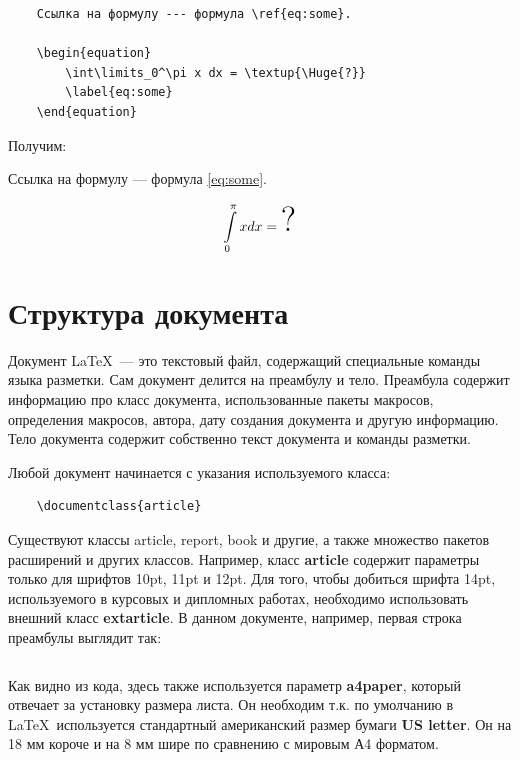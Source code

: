 \begin{verbatim}
    Ссылка на формулу --- формула \ref{eq:some}.

    \begin{equation}
        \int\limits_0^\pi x dx = \textup{\Huge{?}}
        \label{eq:some}
    \end{equation}
\end{verbatim}

Получим:

Ссылка на формулу --- формула \ref{eq:some}.

\begin{equation}
    \int\limits_0^\pi x dx = \textup{\Huge{?}}
    \label{eq:some}
\end{equation}

\section{Структура документа}

Документ \LaTeX~--- это текстовый файл, содержащий специальные команды языка разметки. Сам документ делится на преамбулу и тело. Преамбула содержит информацию про класс документа, использованные пакеты макросов, определения макросов, автора, дату создания документа и другую информацию. Тело документа содержит собственно текст документа и команды разметки.

Любой документ начинается с указания используемого класса:

\begin{verbatim}
    \documentclass{article}
\end{verbatim}

Существуют классы article, report, book и другие, а также множество пакетов расширений и других классов. Например, класс \textbf{article} содержит параметры только для шрифтов 10pt, 11pt и 12pt. Для того, чтобы добиться шрифта 14pt, используемого в курсовых и дипломных работах, необходимо использовать внешний класс \textbf{extarticle}. В данном документе, например, первая строка преамбулы выглядит так:

\inputminted[breaklines,firstline=1,lastline=1,fontsize=\small]{latex}{../preamble.tex}

Как видно из кода, здесь также используется параметр \textbf{a4paper}, который отвечает за установку размера листа. Он необходим т.к. по умолчанию в \LaTeX~используется стандартный американский размер бумаги \textbf{US letter}. Он на 18 мм короче и на 8 мм шире по сравнению с мировым А4 форматом.

